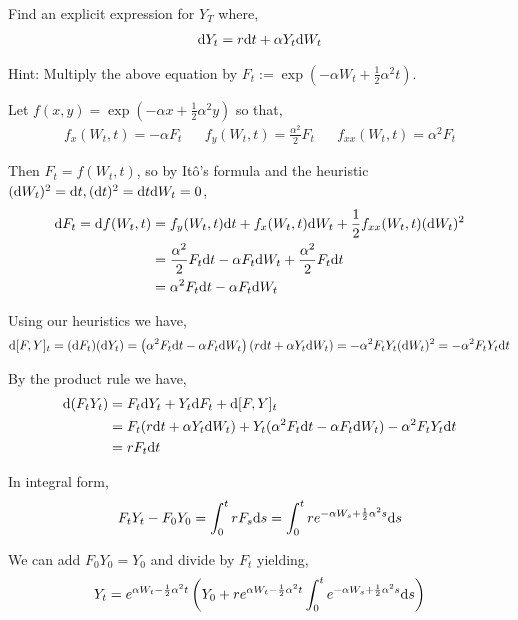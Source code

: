 \begin{problem}[Exercise 8.2]
Find an explicit expression for \( Y_T \) where,
\begin{align*}
    \mathrm{d} Y_t = r \mathrm{d} t + \alpha Y_t \mathrm{d} W_t
\end{align*}

    Hint: Multiply the above equation by \( F_t := \exp(- \alpha W_t + \frac{1}{2} \alpha^2t) \).

\end{problem}


\begin{solution}[Solution]
Let \( f(x,y) = \exp(-\alpha x + \frac{1}{2} \alpha^2 y) \) so that,
\begin{align*}
    f_x(W_t,t) = -\alpha F_t && f_y(W_t,t) = \frac{\alpha^2}{2} F_t && f_{xx}(W_t,t) =  \alpha^2 F_t
\end{align*}

Then \( F_t = f(W_t,t) \), so by It\^o's formula and the heuristic \( (\mathrm{d} W_t)^2 =\mathrm{d} t, (\mathrm{d} t)^2 = \mathrm{d} t \mathrm{d} W_t = 0 \),
\begin{align*}
    \mathrm{d} F_t = \mathrm{d} f(W_t,t) &= f_y(W_t,t) \mathrm{d} t +  f_x(W_t,t) \mathrm{d} W_t + \frac{1}{2} f_{xx}(W_t,t) (\mathrm{d} W_t)^2 
    \\&= \frac{\alpha^2}{2}  F_t \mathrm{d} t -\alpha F_t \mathrm{d} W_t + \frac{\alpha^2}{2} F_t \mathrm{d} t
    \\&= \alpha^2 F_t \mathrm{d} t- \alpha F_t \mathrm{d} W_t
\end{align*}


Using our heuristics we have,
\begin{align*}
    \mathrm{d}[F,Y]_t = (\mathrm{d} F_t)(\mathrm{d} Y_t) = \left( \alpha^2 F_t \mathrm{d} t - \alpha F_t \mathrm{d} W_t \right) \left( r \mathrm{d} t + \alpha Y_t \mathrm{d} W_t \right)
    = -\alpha^2 F_tY_t (\mathrm{d} W_t)^2 
    = -\alpha^2 F_tY_t \mathrm{d} t
\end{align*}


By the product rule we have,
\begin{align*}
    \mathrm{d} (F_tY_t) &=  F_t \mathrm{d} Y_t + Y_t \mathrm{d} F_t + \mathrm{d}[F,Y]_t
    \\&= F_t (r\mathrm{d} t+\alpha Y_t \mathrm{d} W_t) + Y_t (\alpha^2 F_t \mathrm{d} t-\alpha F_t \mathrm{d} W_t) - \alpha^2 F_t Y_t \mathrm{d} t
    \\&= r F_t \mathrm{d} t 
\end{align*}

In integral form,
\begin{align*}
    F_t Y_t - F_0Y_0 = \int_{0}^{t}r F_s \mathrm{d} s = \int_{0}^{t} r e^{-\alpha W_s + \frac{1}{2} \alpha^2 s} \mathrm{d} s
\end{align*}

We can add \( F_0Y_0 = Y_0 \) and divide by \( F_t \) yielding,
\begin{align*}
    Y_t = e^{\alpha W_t - \frac{1}{2} \alpha^2 t} \left( Y_0 + r e^{\alpha W_t - \frac{1}{2}\alpha^2 t} \int_{0}^{t} e^{-\alpha W_s + \frac{1}{2} \alpha^2 s} \mathrm{d} s \right)
\end{align*}
\end{solution}

